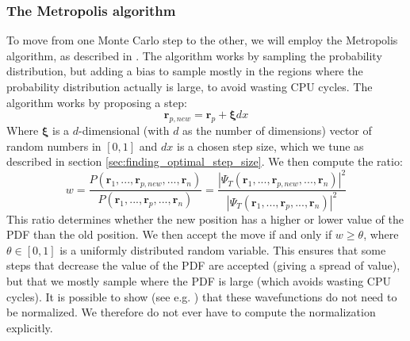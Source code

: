 \documentclass[a4paper, 10pt]{article}
\begin{document}
	\subsubsection{The Metropolis algorithm}
	To move from one Monte Carlo step to the other, we will employ the Metropolis algorithm, as described in \cite{Hjorth-Jensen2015}. The algorithm works by sampling the probability distribution, but adding a bias to sample mostly in the regions where the probability distribution actually is large, to avoid wasting CPU cycles. The algorithm works by proposing a step:
	\begin{equation}
	\boldsymbol{r}_{p, new}=\boldsymbol{r}_p+\boldsymbol{\xi}dx
	\end{equation}
	Where $\boldsymbol{\xi}$ is a $d$-dimensional (with $d$ as the number of dimensions) vector of random numbers in $[0,1]$ and $dx$ is a chosen step size, which we tune as described in section \ref{sec:finding_optimal_step_size}. We then compute the ratio:
	\begin{equation}
	w=\frac{P(\boldsymbol{r}_1, ..., \boldsymbol{r}_{p,new}, ..., \boldsymbol{r}_n)}{P(\boldsymbol{r}_1, ..., \boldsymbol{r}_{p}, ..., \boldsymbol{r}_n)}=\frac{|\Psi_T(\boldsymbol{r}_1, ..., \boldsymbol{r}_{p,new}, ..., \boldsymbol{r}_n)|^2}{|\Psi_T(\boldsymbol{r}_1, ..., \boldsymbol{r}_{p}, ..., \boldsymbol{r}_n)|^2}
	\end{equation}
	This ratio determines whether the new position has a higher or lower value of the PDF than the old position. We then accept the move if and only if $w\geq \theta$, where $\theta\in [0,1]$ is a uniformly distributed random variable. This ensures that some steps that decrease the value of the PDF are accepted (giving a spread of value), but that we mostly sample where the PDF is large (which avoids wasting CPU cycles). It is possible to show (see e.g. \cite{Hjorth-Jensen2015}) that these wavefunctions do not need to be normalized. We therefore do not ever have to compute the normalization explicitly.
\end{document}
